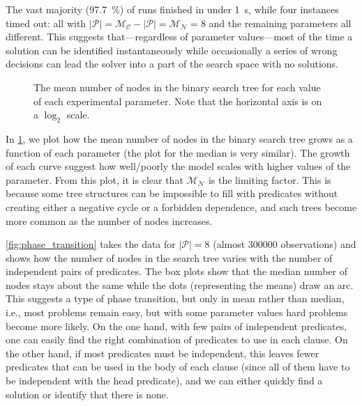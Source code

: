 \documentclass[letterpaper]{article}
\theoremstyle{definition}
\newcommand{\predicates}{\mathcal{P}}
\newcommand{\maxNumNodes}{\mathcal{M}_{\mathcal{N}}}
\newcommand{\maxNumClauses}{\mathcal{M}_{\mathcal{C}}}
\begin{document}
The vast majority (\SI{97.7}{\percent}) of runs finished in under
\SI{1}{\second}, while four instances timed out: all with $|\predicates| =
\maxNumClauses{} - |\predicates{}| = \maxNumNodes{} = 8$ and the remaining
parameters all different. This suggests that---regardless of parameter
values---most of the time a solution can be identified instantaneously while
occasionally a series of wrong decisions can lead the solver into a part of the
search space with no solutions.

\begin{figure}
  \centering
  
  \caption{The mean number of nodes in the binary search tree for each value of
    each experimental parameter. Note that the horizontal axis is on a $\log_2$
    scale.}
  \label{fig:impact}
\end{figure}

In \cref{fig:impact}, we plot how the mean number of nodes in the binary search
tree grows as a function of each parameter (the plot for the median is very
similar). The growth of each curve suggest how well/poorly the model scales with
higher values of the parameter. From this plot, it is clear that
$\maxNumNodes{}$ is the limiting factor. This is because some tree structures
can be impossible to fill with predicates without creating either a negative
cycle or a forbidden dependence, and such trees become more common as the number
of nodes increases.

\begin{figure*}
  \centering
  
  \caption{The distribution of the number of nodes in the binary search tree as
    a function of the number of independent pairs of predicates for
    $|\predicates| = 8$. Significant outliers are hidden, the dots denote mean
    values, and the vertical axis is on a $\log_{10}$ scale.}
  \label{fig:phase_transition}
\end{figure*}

\cref{fig:phase_transition} takes the data for $|\predicates{}| = 8$ (almost
\num{300000} observations) and shows how the number of nodes in the search tree
varies with the number of independent pairs of predicates. The box plots show
that the median number of nodes stays about the same while the dots
(representing the means) draw an arc. This suggests a type of phase transition,
but only in mean rather than median, i.e., most problems remain easy, but with
some parameter values hard problems become more likely. On the one hand, with
few pairs of independent predicates, one can easily find the right combination
of predicates to use in each clause. On the other hand, if most predicates must
be independent, this leaves fewer predicates that can be used in the body of
each clause (since all of them have to be independent with the head predicate),
and we can either quickly find a solution or identify that there is none.
\end{document}
